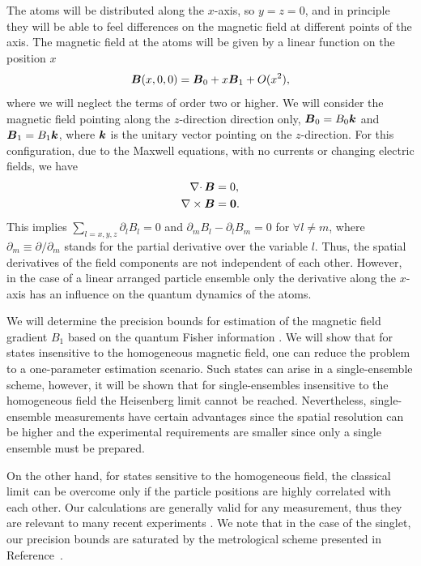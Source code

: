 The atoms will be distributed along the $x$-axis, so $y=z=0$, and in principle they will be able to feel differences on the magnetic field at different points of the axis.
The magnetic field at the atoms will be given by a linear function on the position $x$
\begin{equation}
\boldsymbol{B}(x,0,0)=\boldsymbol{B}_0 +x \boldsymbol{B}_1 + O(x^2),
\end{equation}
where we will neglect the terms of order two or higher.
We will consider the magnetic field pointing along the $z$-direction direction only, $\boldsymbol{B}_0=B_0 \boldsymbol{k}$ and $\boldsymbol{B}_1=B_1\boldsymbol{k}$, where $\boldsymbol{k}$ is the unitary vector pointing on the $z$-direction.
For this configuration, due to the Maxwell equations, with no currents or changing electric fields, we have
\begin{align}
\nabla \cdotp \boldsymbol{B}&=0, \nonumber \\
\nabla \times \boldsymbol{B}&=\boldsymbol{0}.
\end{align}
This implies $\sum_{l=x,y,z} \partial_l B_l=0$ and $ \partial_m B_l - \partial_l B_m =0$ for $\forall l\ne m$, where $\partial_m\equiv \partial/\partial_m$ stands for the partial derivative over the variable $l$.
Thus, the spatial derivatives of the field components are not independent of each other.
However, in the case of a linear arranged particle ensemble only the derivative along the $x$-axis has an influence on the quantum dynamics of the atoms.


We will determine the precision bounds for estimation of the magnetic field gradient $B_1$ based on the quantum Fisher information \citep{Paris2009,Braunstein1994,Holevo1982,Helstrom1976,Petz2002,Petz2008}.
We will show that for states insensitive to the homogeneous magnetic field, one can reduce the problem to a one-parameter estimation scenario.
Such states can arise in a single-ensemble scheme, however, it will be shown that for single-ensembles insensitive to the homogeneous field the Heisenberg limit cannot be reached.
Nevertheless, single-ensemble measurements have certain advantages since the spatial resolution can be higher and the experimental requirements are smaller since only a single ensemble must be prepared.

On the other hand, for states sensitive to the homogeneous field, the classical limit can be overcome only if the particle positions are highly correlated with each other.
Our calculations are generally valid for any measurement, thus they are relevant to many recent experiments \citep{Wasilewski2010,Eckert2006,Wildermuth2006, Wolfgramm2010,Koschorreck2011,Vengalattore2007,Zhou2010,Behbood2013}.
We note that in the case of the singlet, our precision bounds are saturated by the metrological scheme presented in Reference~\citep{Urizar-Lanz2013}.

